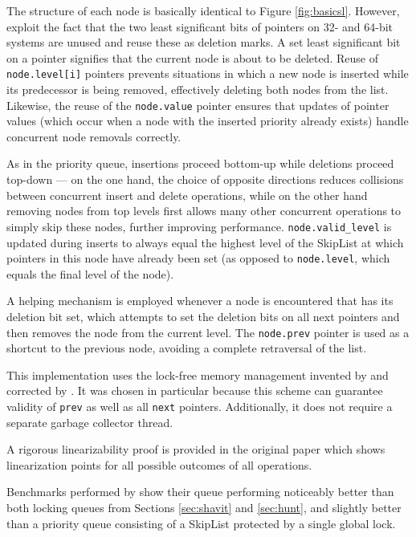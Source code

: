 \documentclass[a4paper,10pt]{article}
\begin{document}
The structure of each node is basically identical to Figure \ref{fig:basicsl}. However, \citeauthor{sundell2003fast}
exploit the fact that the two least significant bits of pointers on 32- and 64-bit systems
are unused and reuse these as deletion marks. A set least significant bit on a pointer signifies
that the current node is about to be deleted.
Reuse of \lstinline|node.level[i]| pointers
prevents situations in which a new node is inserted while its predecessor is being removed,
effectively deleting both nodes from the list. Likewise, the reuse of the \lstinline|node.value|
pointer ensures that updates of pointer values (which occur when a node with the inserted priority already exists)
handle concurrent node removals correctly.

As in the \citeauthor{shavit2000skiplist} priority queue, insertions proceed bottom-up while
deletions proceed top-down --- on the one hand, the choice of opposite directions reduces collisions
between concurrent insert and delete operations, while on the other hand removing nodes from top levels first
allows many other concurrent operations to simply skip these nodes, further improving performance.
\lstinline|node.valid_level| is updated during inserts to always equal the highest level of the SkipList
at which pointers in this node have already been set (as opposed to \lstinline|node.level|, which equals
the final level of the node).

A helping mechanism is employed whenever a node is encountered that has its deletion bit set, which attempts
to set the deletion bits on all next pointers and then removes the node from the current level. The
\lstinline|node.prev| pointer is used as a shortcut to the previous node, avoiding a complete retraversal
of the list.

This implementation uses the lock-free memory management invented by \citeauthor{valois1996lock}
\cite{valois1995lock,valois1996lock} and corrected by \citeauthor{michael1995correction}
\cite{michael1995correction}. It was chosen in particular because this scheme can guarantee validity
of \lstinline|prev| as well as all \lstinline|next| pointers. Additionally, it does not require a separate
garbage collector thread.

A rigorous linearizability proof is provided in the original paper \cite{sundell2003fast} which shows
linearization points for all possible outcomes of all operations.

Benchmarks performed by \citeauthor{sundell2003fast} show their queue performing noticeably better than both locking
queues from Sections \ref{sec:shavit} and \ref{sec:hunt}, and slightly better than a priority queue
consisting of a SkipList protected by a single global lock.
\end{document}
